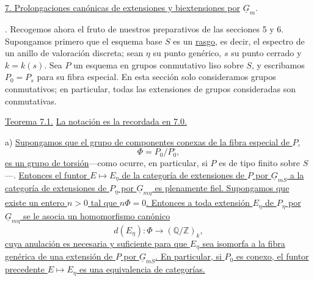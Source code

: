 
\medskip
\noindent\underline{7. Prolongaciones canónicas de extensiones y
biextensiones por} $\underline G_m$.

\medskip
{}. Recogemos ahora el fruto de nuestros preparativos de las
secciones 5 y 6. Supongamos primero que el esquema base $S$ es un
\underline{rasgo}, es decir, el espectro de un anillo de valoración
discreta; sean $\eta$ su punto genérico, $s$ su punto cerrado y
$k=k(s)$. Sea $P$ un esquema en grupos conmutativo liso sobre $S$, y
escribamos $P_0=P_s$ para su fibra especial. En esta sección solo
consideramos grupos conmutativos; en particular, todas las extensiones
de grupos consideradas son conmutativas.

\medskip
\noindent\underline{Teorema 7.1.} \underline{La notación es la
recordada en 7.0.}

\smallskip
\noindent a) \underline{Supongamos que el grupo de componentes conexas
de la fibra especial de $P$,}
\[
 \Phi=P_0/P_0^{\circ},
\]
\underline{es un grupo de torsión}---como ocurre, en particular, si
$P$ es de tipo finito sobre $S$---. \underline{Entonces el funtor
$E\mapsto E_\eta$ de la categoría de extensiones de $P$ por
$\underline G_{mS}$ a la categoría de extensiones de $P_\eta$ por
$\underline G_{m\eta}$ es plenamente fiel. Supongamos que existe un
entero $n>0$ tal que $n\Phi=0$. Entonces a toda extensión $E_\eta$ de
$P_\eta$ por $\underline G_{m\eta}$ se le asocia un homomorfismo
canónico}
\begin{equation}\tag{7.1.1}
 d(E_\eta):\Phi\longrightarrow(\mathbb Q/\mathbb Z)_k,
\end{equation}
\underline{cuya anulación es necesaria y suficiente para que $E_\eta$
sea isomorfa a la fibra genérica de una extensión de $P$ por
$\underline G_{mS}$. En particular, si $P_0$ es conexo, el funtor
precedente $E\mapsto E_\eta$ es una equivalencia de categorías.}


